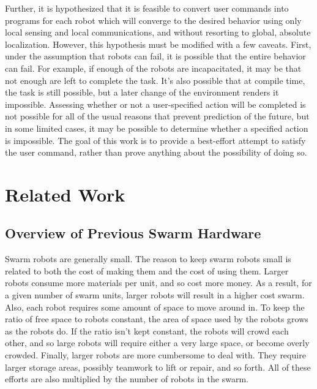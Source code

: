\documentclass[]{article}
\begin{document}
Further, it is hypothesized that it is feasible to convert user commands into programs for each robot which will converge to the desired behavior using only local sensing and local communications, and without resorting to global, absolute localization. 
However, this hypothesis must be modified with a few caveats. 
First, under the assumption that robots can fail, it is possible that the entire behavior can fail. 
For example, if enough of the robots are incapacitated, it may be that not enough are left to complete the task. 
It's also possible that at compile time, the task is still possible, but a later change of the environment renders it impossible. 
Assessing whether or not a user-specified action will be completed is not possible for all of the usual reasons that prevent prediction of the future, but in some limited cases, it may be possible to determine whether a specified action is impossible. The goal of this work is to provide a best-effort attempt to satisfy the user command, rather than prove anything about the possibility of doing so. 


\section{Related Work}

\subsection{Overview of Previous Swarm Hardware}

Swarm robots are generally small. 
The reason to keep swarm robots small is related to both the cost of making them and the cost of using them. 
Larger robots consume more materials per unit, and so cost more money.
As a result, for a given number of swarm units, larger robots will result in a higher cost swarm. 
Also, each robot requires some amount of space to move around in. 
To keep the ratio of free space to robots constant, the area of space used by the robots grows as the robots do. 
If the ratio isn't kept constant, the robots will crowd each other, and so large robots will require either a very large space, or become overly crowded.
Finally, larger robots are more cumbersome to deal with. 
They require larger storage areas, possibly teamwork to lift or repair, and so forth. 
All of these efforts are also multiplied by the number of robots in the swarm. 
\end{document}
